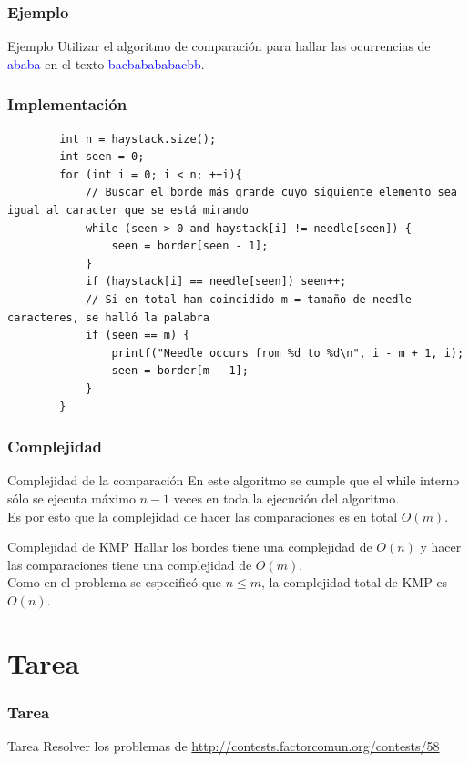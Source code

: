 \documentclass{beamer}
\begin{document}
	\begin{frame}
		\frametitle{Ejemplo}
		\begin{block}{Ejemplo}
			Utilizar el algoritmo de comparación para hallar las ocurrencias de \textcolor{blue}{\Large ababa} en el texto \textcolor{blue}{\Large bacbabababacbb}.
		\end{block}
	\end{frame}
	
	\begin{frame}[fragile]
		\frametitle{Implementación}
		\begin{lstlisting}
		int n = haystack.size();
		int seen = 0;
		for (int i = 0; i < n; ++i){
			// Buscar el borde más grande cuyo siguiente elemento sea igual al caracter que se está mirando
		    while (seen > 0 and haystack[i] != needle[seen]) {
		        seen = border[seen - 1];
		    }
		    if (haystack[i] == needle[seen]) seen++;
		    // Si en total han coincidido m = tamaño de needle caracteres, se halló la palabra
		    if (seen == m) {
		        printf("Needle occurs from %d to %d\n", i - m + 1, i);
		        seen = border[m - 1];
		    }
		}
		\end{lstlisting}
	\end{frame}

	\begin{frame}
		\frametitle{Complejidad}
		\begin{block}{Complejidad de la comparación}
			En este algoritmo se cumple que el while interno sólo se ejecuta máximo $n-1$ veces en toda la ejecución del algoritmo.\\
			Es por esto que la complejidad de hacer las comparaciones es en total $O(m)$.
		\end{block}
		
		\begin{block}{Complejidad de KMP}
			Hallar los bordes tiene una complejidad de $O(n)$ y hacer las comparaciones tiene una complejidad de $O(m)$.\\
			Como en el problema se especificó que $n \leq m$, la complejidad total de KMP es $O(n)$.
		\end{block}
	\end{frame}
	

\section{Tarea}
	\begin{frame}[fragile]
		\frametitle{Tarea}
		\begin{alertblock}{Tarea}
			Resolver los problemas de \url{http://contests.factorcomun.org/contests/58}
		\end{alertblock}
	\end{frame}
\end{document}
